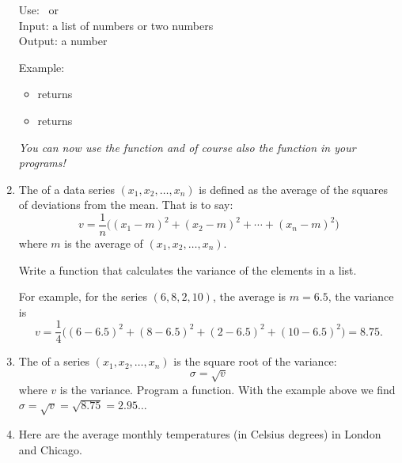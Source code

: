 \documentclass[11pt,class=report,crop=false]{standalone}
\begin{document}
\begin{activite}
\begin{enumerate}
  
  \begin{fonctionpython}
   Use:  \ or \ \\
   Input: a list of numbers or two numbers\\
   Output: a number
  
  \medskip
     
   Example: 
  \begin{itemize}  
    \item {} returns   
    \item {} returns 
  \end{itemize}    

  \end{fonctionpython}   
  
  \emph{You can now use the  function and of course also the  function in your programs!} 
  
  \item The  of a data series $(x_1,x_2,\ldots,x_n)$ is defined as the average of the squares of deviations from the mean. That is to say:
  $$v = \frac{1}{n}\big((x_1-m)^2 + (x_2-m)^2 + \cdots + (x_n-m)^2\big)$$
  where $m$ is the average of $(x_1,x_2,\ldots,x_n)$.
  
  Write a  function that calculates the variance of the elements in a list.
  
  For example, for the series $(6,8,2,10)$, the average is $m = 6.5$, the variance is
  $$v = \frac{1}{4} \big((6-6.5)^2 + (8-6.5)^2 + (2-6.5)^2 + (10-6.5)^2\big) = 8.75.$$
  
  \item The  of a series $(x_1,x_2,\ldots,x_n)$ is the square root of the variance:
  $$\sigma = \sqrt{v}$$
  where $v$ is the variance. Program a  function.
  With the example above we find $\sigma = \sqrt{v} = \sqrt{8.75} = 2.95\ldots$
  

  \item Here are the average monthly temperatures (in Celsius degrees) in London and Chicago.


\end{enumerate}
\end{activite}
\end{document}
